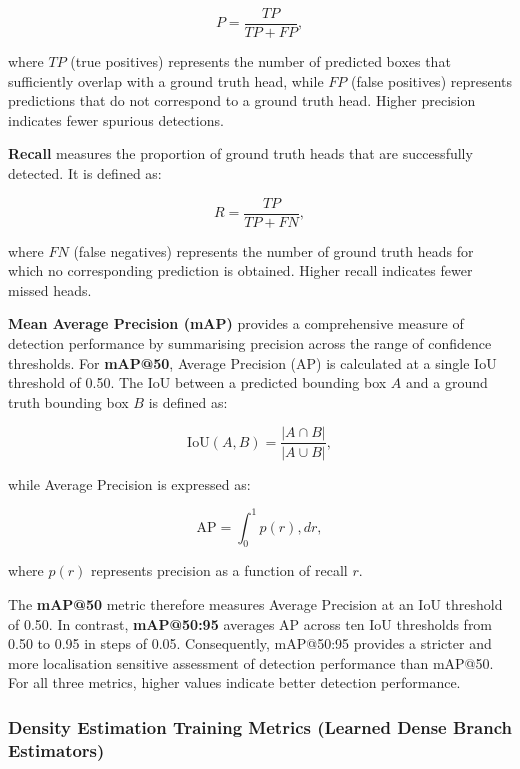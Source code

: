 \begin{equation}
	P = \frac{TP}{TP + FP},
\end{equation}

where $TP$ (true positives) represents the number of predicted boxes that sufficiently overlap with a ground truth head, while $FP$ (false positives) represents predictions that do not correspond to a ground truth head. Higher precision indicates fewer spurious detections.

\textbf{Recall} measures the proportion of ground truth heads that are successfully detected. It is defined as:

\begin{equation}
	R = \frac{TP}{TP + FN},
\end{equation}

where $FN$ (false negatives) represents the number of ground truth heads for which no corresponding prediction is obtained. Higher recall indicates fewer missed heads.

\textbf{Mean Average Precision (mAP)} provides a comprehensive measure of detection performance by summarising precision across the range of confidence thresholds. For \textbf{mAP@50}, Average Precision (AP) is calculated at a single IoU threshold of 0.50. The IoU between a predicted bounding box $A$ and a ground truth bounding box $B$ is defined as:

\begin{equation}
	\text{IoU}(A,B) = \frac{|A \cap B|}{|A \cup B|},
\end{equation}

while Average Precision is expressed as:

\begin{equation}
	\text{AP} = \int_0^1 p(r),dr,
\end{equation}

where $p(r)$ represents precision as a function of recall $r$.

The \textbf{mAP@50} metric therefore measures Average Precision at an IoU threshold of 0.50. In contrast, \textbf{mAP@50:95} averages AP across ten IoU thresholds from 0.50 to 0.95 in steps of 0.05. Consequently, mAP@50:95 provides a stricter and more localisation sensitive assessment of detection performance than mAP@50. For all three metrics, higher values indicate better detection performance.

\subsubsection{Density Estimation Training Metrics (Learned Dense Branch Estimators)}

